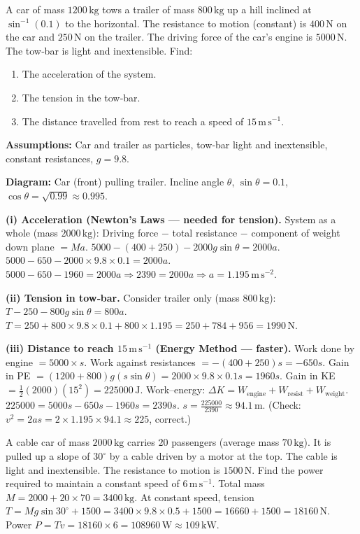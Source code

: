 \documentclass[11pt]{article}
\newcounter{popsec}
\newcounter{popsub}
\newcommand{\courssub}[1]{%
  \stepcounter{popsub}%
  \par\vspace{9pt}\noindent{\popxbold\fontsize{11.5}{13}\selectfont\color{popink}{\color{poporange}\thepopsec.\thepopsub}\hspace{6pt}#1}\par\nopagebreak\vspace{4pt}
}
\begin{document}
\begin{exoresolu}
A car of mass $1200\,\mathrm{kg}$ tows a trailer of mass $800\,\mathrm{kg}$ up a hill inclined at $\sin^{-1}(0.1)$ to the horizontal.  The resistance to motion (constant) is $400\,\mathrm{N}$ on the car and $250\,\mathrm{N}$ on the trailer.  The driving force of the car's engine is $5000\,\mathrm{N}$.  The tow‑bar is light and inextensible.  Find:
\begin{enumerate}
\item The acceleration of the system.
\item The tension in the tow‑bar.
\item The distance travelled from rest to reach a speed of $15\,\mathrm{m\,s^{-1}}$.
\end{enumerate}
\tcblower
\textbf{Assumptions:} Car and trailer as particles, tow‑bar light and inextensible, constant resistances, $g=9.8$.

\textbf{Diagram:} Car (front) pulling trailer.  Incline angle $\theta$, $\sin\theta=0.1$, $\cos\theta=\sqrt{0.99}\approx0.995$.

\textbf{(i) Acceleration (Newton's Laws — needed for tension).}
System as a whole (mass $2000\,\mathrm{kg}$):
Driving force $-$ total resistance $-$ component of weight down plane $= Ma$.
$5000 - (400+250) - 2000g\sin\theta = 2000a$.
$5000 - 650 - 2000\times9.8\times0.1 = 2000a$.
$5000 - 650 - 1960 = 2000a \Rightarrow 2390 = 2000a \Rightarrow a = 1.195\,\mathrm{m\,s^{-2}}$.

\textbf{(ii) Tension in tow‑bar.}
Consider trailer only (mass $800\,\mathrm{kg}$):
$T - 250 - 800g\sin\theta = 800a$.
$T = 250 + 800\times9.8\times0.1 + 800\times1.195 = 250 + 784 + 956 = 1990\,\mathrm{N}$.

\textbf{(iii) Distance to reach $15\,\mathrm{m\,s^{-1}}$ (Energy Method — faster).}
Work done by engine $= 5000 \times s$.
Work against resistances $= -(400+250)s = -650s$.
Gain in PE $= (1200+800)g (s\sin\theta) = 2000 \times 9.8 \times 0.1 s = 1960s$.
Gain in KE $= \frac{1}{2}(2000)(15^2) = 225000\,\mathrm{J}$.
Work–energy: $\Delta K = W_{\text{engine}} + W_{\text{resist}} + W_{\text{weight}}$.
$225000 = 5000s - 650s - 1960s = 2390s$.
$s = \frac{225000}{2390} \approx 94.1\,\mathrm{m}$.
(Check: $v^2 = 2as = 2\times1.195\times94.1 \approx 225$, correct.)
\end{exoresolu}

\courssub{Further Real-Life Examples}

\begin{exemplebox}
A cable car of mass $2000\,\mathrm{kg}$ carries $20$ passengers (average mass $70\,\mathrm{kg}$).  It is pulled up a slope of $30^\circ$ by a cable driven by a motor at the top.  The cable is light and inextensible.  The resistance to motion is $1500\,\mathrm{N}$.  Find the power required to maintain a constant speed of $6\,\mathrm{m\,s^{-1}}$.
\tcblower
Total mass $M = 2000 + 20\times70 = 3400\,\mathrm{kg}$.
At constant speed, tension $T = Mg\sin30^\circ + 1500 = 3400\times9.8\times0.5 + 1500 = 16660 + 1500 = 18160\,\mathrm{N}$.
Power $P = Tv = 18160 \times 6 = 108960\,\mathrm{W} \approx 109\,\mathrm{kW}$.
\end{exemplebox}
\end{document}
